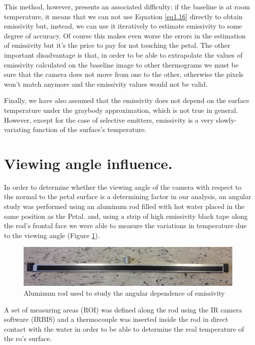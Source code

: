 		This method, however, presents an associated difficulty: if the baseline is at room temperature, it means that we can not use Equation \ref{eq1.16} directly to obtain emissivity but, instead, we can use it iteratively to estimate emissivity to some degree of accuracy. Of course this makes even worse the errors in the estimation of emissivity but it’s the price to pay for not touching the petal. The other important disadvantage is that, in order to be able to extrapolate the values of emissivity calculated on the baseline image to other thermograms we must be sure that the camera does not move from one to the other, otherwise the pixels won’t match anymore and the emissivity values would not be valid.
		
		Finally, we have also assumed that the emissivity does not depend on the surface temperature under the graybody approximation, which is not true in general. However, except for the case of selective emitters, emissivity is a very slowly-variating function of the surface’s temperature.\bigskip
		
	\section{Viewing angle influence.}\label{section3.4}
	
		In order to determine whether the viewing angle of the camera with respect to the normal to the petal surface is a determining factor in our analysis, an angular study was performed using an aluminum rod filled with hot water placed in the same position as the Petal.  and, using a strip of high emissivity black tape along the rod’s frontal face we were able to measure the variations in temperature due to the viewing angle (Figure \ref{fig3.4}).
	
		\begin{figure}[H]
			\centering
			\captionsetup{justification=centering,margin=2cm}
			\includegraphics[scale=0.30]{Figures/Chapter03/AluminumRod.pdf}
			\caption{Aluminum rod used to study the angular dependence of emissivity}\label{fig3.4}
		\end{figure}		
		
		A set of measuring areas (ROI) was defined along the rod using the IR camera software (IRBIS) and a thermocouple was inserted inside the rod in direct contact with the water in order to be able to determine the real temperature of the ro’s surface.
	
	